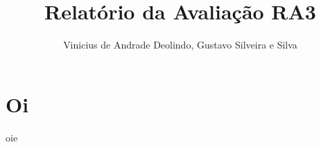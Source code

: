 \documentclass[12pt]{article}
\title{Relatório da Avaliação RA3}
\author{Vinicius de Andrade Deolindo\inst{1}, Gustavo Silveira e Silva\inst{1}}
\begin{document}
 

\maketitle

\section{Oi}
oie
\end{document}

